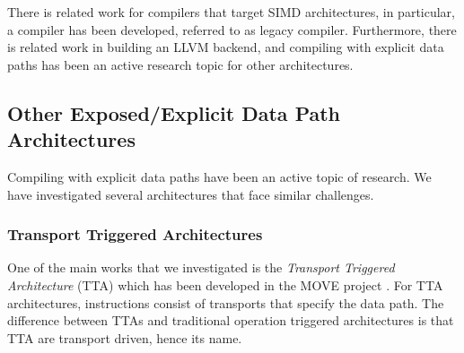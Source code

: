 



There is related work for compilers that target SIMD architectures, in particular, a compiler has been developed, referred to as legacy compiler. Furthermore, there is related work in building an LLVM backend, and compiling with explicit data paths has been an active research topic for other architectures.


\subsection{Other Exposed/Explicit Data Path Architectures}\label{sec:other_explicit_datapaths}
Compiling with explicit data paths have been an active topic of research. We have investigated several architectures that face similar challenges. 


\subsubsection{Transport Triggered Architectures}\label{sec:tta}
One of the main works that we investigated is the  \emph{Transport Triggered Architecture} (TTA) which has been developed in the MOVE project \cite{tta_codegen}. For TTA architectures, instructions consist of transports that specify the data path. The difference between TTAs and traditional operation triggered architectures is that TTA are transport driven, hence its name. 

